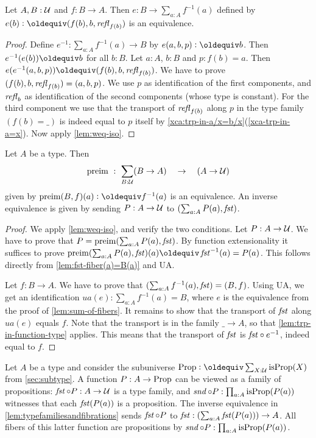 \begin{definition}
\begin{lemma}\label{lem:sum-of-fibers}
Let $A,B:\mathcal{U}$ and $f:B\to A$. 
Then $e: B \to \sum_{a:A} f^{-1}(a)$ defined by
$e(b)\defeq (f(b),b,\refl{f(b)})$ is an equivalence.
\end{lemma}
\begin{proof}
Define $e^{-1}: \sum_{a:A} f^{-1}(a) \to B$ by $e(a,b,p)\defeq b$.
Then $e^{-1}(e(b))\jdeq b$ for all $b:B$.
Let $a:A$, $b:B$ and $p: f(b)=a$.
Then $e(e^{-1}(a,b,p))\jdeq (f(b),b,\refl{f(b)})$.
We have to prove $(f(b),b,\mathop{{\it refl}_{f(b)}})=(a,b,p)$.
We use $p$ as identification of the first components,
and $\mathop{{\it refl}_{b}}$ as identification of the second components
(whose type is constant). For the third component
we use that the transport of $\mathop{{\it refl}_{f(b)}}$ along $p$
in the type family $(f(b)=\_)$ is indeed equal to $p$
itself by \cref{xca:trp-in-a/x=b/x}(\ref{xca-trp-in-a=x}).
Now apply \cref{lem:weq-iso}.
\end{proof}

\begin{lemma}\label{lem:typefamiliesandfibrations}
Let $A$ be a type. Then
\[
\mathop{\mathrm{preim}} ~:~ \sum_{B:\mathcal{U}}(B\to A) \quad\to\quad (A\to\mathcal{U}) 
\] 
given by $\preim(B,f)(a)\defeq f^{-1}(a)$ is an equivalence.
An inverse equivalence is given by sending $P:A\to\mathcal{U}$ to 
$(\sum_{a:A}P(a), \mathop{\mathit{fst}})$.
\end{lemma}

\begin{proof}
We apply \cref{lem:weq-iso}, and verify the two conditions.
Let $P:A\to\mathcal{U}$. We have to prove that $P = \mathop{\mathrm{preim}}(\sum_{a:A}P(a), \mathop{\mathit{fst}})$.
By function extensionality it suffices to prove
$\preim(\sum_{a:A}P(a), \fst)(a)\jdeq \fst^{-1}(a) = P(a)$.
This follows directly from \cref{lem:fst-fiber(a)=B(a)} and UA.

Let $f: B\to A$. We have to prove that $(\sum_{a:A} f^{-1}(a), \mathop{\mathit{fst}})=(B,f)$.
Using UA, we get an identification
$ua(e) : \sum_{a:A} f^{-1}(a) = B$, where $e$ is the equivalence
from the proof of \cref{lem:sum-of-fibers}. It remains
to show that the transport of $\mathop{\mathit{fst}}$ along $ua(e)$ equals $f$.
Note that the transport is in the family $\_\to A$, so that
\cref{lem:trp-in-function-type} applies. This means that
the transport of $\mathop{\mathit{fst}}$ is ${\mathop{\mathit{fst}}} \circ {e^{-1}}$, indeed equal to $f$.
\end{proof}

Let $A$ be a type and consider the subuniverse 
$\Prop\defeq \sum_{X:\UU}\isprop(X)$ from \cref{sec:subtype}.
A function $P: A\to\mathord{\mathrm{Prop}}$ can be viewed as a family of propositions:
$\mathop{\mathit{fst}}\circ P : A\to \mathcal{U}$ is a type family, and
$\mathop{\mathit{snd}}\circ P : \prod_{a:A} \mathrm{isProp}(P(a))$ witnesses
that each $\mathop{\mathit{fst}}(P(a))$ is a proposition.
The inverse equivalence in \cref{lem:typefamiliesandfibrations}
sends $\mathop{\mathit{fst}}\circ P$ to $\mathop{\mathit{fst}}: (\sum_{a:A} \mathop{\mathit{fst}}(P(a))) \to A$.
All fibers of this latter function are propositions by
$\mathop{\mathit{snd}}\circ P : \prod_{a:A} \mathrm{isProp}(P(a))$. 


\end{definition}
